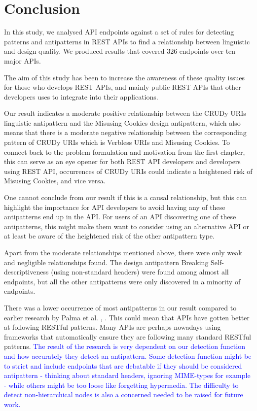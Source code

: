 \section{Conclusion}

In this study, we analysed API endpoints against a set of rules for detecting patterns and antipatterns in REST APIs to find a relationship between linguistic and design quality. We produced results that covered 326 endpoints over ten major APIs. 

The aim of this study has been to increase the awareness of these quality issues for those who develops REST APIs, and mainly public REST APIs that other developers uses to integrate into their applications. 

Our result indicates a moderate positive relationship between the  CRUDy URIs linguistic antipattern and the  Misusing Cookies design antipattern, which also means that there is a moderate negative relationship between the corresponding pattern of CRUDy URIs which is Verbless URIs and Misusing Cookies. To connect back to the problem formulation and motivation from the first chapter, this can serve as an eye opener for both REST API developers and developers using REST API, occurrences of CRUDy URIs could indicate a heightened risk of Misusing Cookies, and vice versa. 

One cannot conclude from our result if this is a causal relationship, but this can highlight the importance for API developers to avoid having any of these antipatterns end up in the API. For users of an API discovering one of these antipatterns, this might make them want to consider using an alternative API or at least be aware of the heightened risk of the other antipattern type. 

Apart from the moderate relationships mentioned above, there were only weak and negligible relationships found. The design antipattern Breaking Self-descriptiveness (using non-standard headers) were found among almost all endpoints, but all the other antipatterns were only discovered in a minority of endpoints. 

There was a lower occurrence of most antipatterns in our result compared to earlier research by Palma et al. \cite{design}, \cite{linguistic}. This could mean that APIs have gotten better at following RESTful patterns. Many APIs are perhaps nowadays using frameworks that automatically ensure they are following many standard RESTful patterns. \textcolor{blue}{The result of the research is very dependent on our detection function and how accurately they detect an antipattern. Some detection function might be to strict and include endpoints that are debatable if they should be considered antipattern - thinking about standard headers, ignoring MIME-types for example - while others might be too loose like forgetting hypermedia. The difficulty to detect non-hierarchical nodes is also a concerned needed to be raised for future work.}

